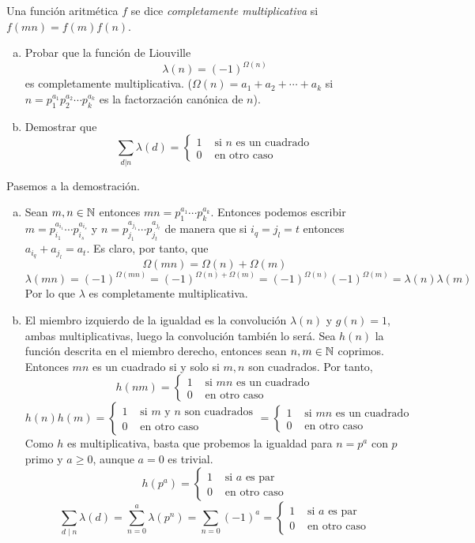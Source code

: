 \documentclass[twoside]{article}
\begin{document}
\begin{ejercicio}{6}
Una función aritmética $f$ se dice \textit{completamente multiplicativa} si $f(mn)=f(m)f(n)$.
\begin{enumerate}[(a)]
\item Probar que la función de Liouville
	\[ λ(n) = (-1)^{Ω(n)} \]
	es completamente multiplicativa. ($Ω(n) = a_1+a_2+\cdots+a_k$ si $n=p_1^{a_1}p_2^{a_2}\cdots p_k^{a_k}$ es la factorzación canónica de $n$).
\item Demostrar que
	\[ \sum_{d|n} λ(d) = \begin{cases}
		1 &\text{ si }n\text{ es un cuadrado}\\
		0 &\text{ en otro caso}
	\end{cases}\]
\end{enumerate}
\end{ejercicio}
\begin{solucion}
Pasemos a la demostración.
\begin{enumerate}[(a)]
\item Sean $m,n\in \mathbb{N}$ entonces $mn = p_1^{a_1}\cdots p_k^{a_k}$. Entonces podemos escribir $m=p_{i_1}^{a_{i_1}}\cdots p_{i_s}^{a_{i_s}}$ y $n=p_{j_1}^{a_{j_1}}\cdots p_{j_t}^{a_{j_t}}$ de manera que si $i_q=j_l = t$ entonces $a_{i_q}+a_{j_l}=a_t$. Es claro, por tanto, que 
$$ \Omega(mn) = \Omega(n)+\Omega(m) $$ $$ \lambda(mn) = (-1)^{\Omega(mn)}=(-1)^{ \Omega(n)+\Omega(m)} = (-1)^{\Omega(n)}(-1)^{\Omega(m)} = \lambda(n)\lambda(m)
$$
Por lo que $\lambda$ es completamente multiplicativa.
\item  El miembro izquierdo de la igualdad es la convolución $\lambda(n)$ y $g(n)=1$, ambas multiplicativas, luego la convolución también lo será. Sea $h(n)$ la función descrita en el miembro derecho, entonces sean $n,m\in \mathbb{N}$ coprimos. Entonces $mn$ es un cuadrado si y solo si $m,n$ son cuadrados. Por tanto,
 $$
 h(nm)=\begin{cases}
 		1 &\text{ si }mn\text{ es un cuadrado}\\
 		0 &\text{ en otro caso}
 	\end{cases}
 $$
 $$h(n)h(m)=\begin{cases}
 		1 &\text{ si $m$ y $n$ son cuadrados}\\
 		0 &\text{ en otro caso}
 	\end{cases}
 	=\begin{cases}
 		1 &\text{ si $mn$ es un cuadrado}\\
 		0 &\text{ en otro caso}
	\end{cases}
 $$
 \newpage
 Como $h$ es multiplicativa, basta que probemos la igualdad para $n=p^a$ con $p$ primo y $a\geq 0$, aunque $a=0$ es trivial. 
 $$h(p^a) = \begin{cases}
 		1 &\text{ si $a$ es par}\\
 		0 &\text{ en otro caso}
 	\end{cases}	$$
 	$$
 	\sum_{d\mid n}\lambda(d) = \sum_{n=0}^a \lambda(p^n) = \sum_{n=0} (-1)^a = \begin{cases}
 		1 &\text{ si $a$ es par}\\
 		0 &\text{ en otro caso}
 	\end{cases}	$$
 	\end{enumerate}

\end{solucion}
\end{document}
